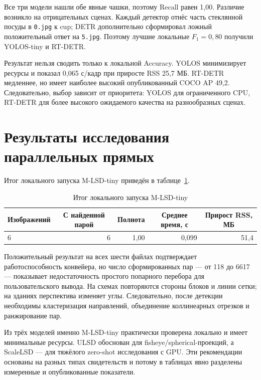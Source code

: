 \documentclass[a4paper,12pt]{extreport}
\newcommand{\code}[1]{\nolinkurl{#1}}
\begin{document}
Все три модели нашли обе явные чашки, поэтому Recall равен 1,00. Различие возникло на отрицательных сценах. Каждый детектор отнёс часть стеклянной посуды в \code{0.jpg} к cup; DETR дополнительно сформировал ложный положительный ответ на \code{5.jpg}. Поэтому лучшие локальные $F_1=0,80$ получили YOLOS-tiny и RT-DETR.

Результат нельзя сводить только к локальной Accuracy. YOLOS минимизирует ресурсы и показал 0,065 с/кадр при приросте RSS 25,7 МБ. RT-DETR медленнее, но имеет наиболее высокий опубликованный COCO AP 49,2. Следовательно, выбор зависит от приоритета: YOLOS для ограниченного CPU, RT-DETR для более высокого ожидаемого качества на разнообразных сценах.

\section{Результаты исследования параллельных прямых}

Итог локального запуска M-LSD-tiny приведён в таблице~\ref{tab:lines-final}.

\begin{table}[H]
\centering\small
\caption{Итог локального запуска M-LSD-tiny}
\label{tab:lines-final}
\begin{tabular}{|l|r|r|r|r|}
\hline
\multicolumn{1}{|c|}{Изображений} & \multicolumn{1}{c|}{С найденной парой} & \multicolumn{1}{c|}{Полнота} & \multicolumn{1}{c|}{Среднее время, с} & \multicolumn{1}{c|}{Прирост RSS, МБ} \\
\hline
6 & 6 & 1,00 & 0,099 & 51,4\\
\hline
\end{tabular}
\end{table}

Положительный результат на всех шести файлах подтверждает работоспособность конвейера, но число сформированных пар --- от 118 до 6617 --- показывает недостаточность простого попарного перебора для пользовательского вывода. На схемах повторяются стороны блоков и линии сетки; на зданиях перспектива изменяет углы. Следовательно, после детекции необходимы кластеризация направлений, объединение коллинеарных отрезков и ранжирование пар.

Из трёх моделей именно M-LSD-tiny практически проверена локально и имеет минимальные ресурсы. ULSD обоснован для fisheye/spherical-проекций, а ScaleLSD --- для тяжёлого zero-shot исследования с GPU. Эти рекомендации основаны на разных типах свидетельств и потому в таблицах явно разделены измеренные и опубликованные показатели.
\end{document}
